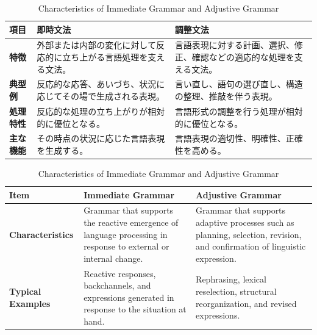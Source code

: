 \documentclass[a4paper]{article}
\begin{document}
\ifJPN
\begin{table}[ht]\centering\small
\caption{即時文法と調整文法の特徴}
\else
\begin{table}[ht]\centering\small
\caption{Characteristics of Immediate Grammar and Adjustive Grammar}
\fi
\label{tab:characteristics}

\ifJPN

\begin{tabular}{@{}
>{\raggedright\arraybackslash}p{14mm}
>{\raggedright\arraybackslash}p{68mm}
>{\raggedright\arraybackslash}p{68mm}
@{}
}

\toprule
\textbf{項目}
& \textbf{即時文法}
& \textbf{調整文法} \\
\midrule

\textbf{特徴}
& 外部または内部の変化に対して反応的に立ち上がる言語処理を支える文法。
& 言語表現に対する計画、選択、修正、確認などの適応的な処理を支える文法。 \\

\textbf{典型例}
& 反応的な応答、あいづち、状況に応じてその場で生成される表現。
& 言い直し、語句の選び直し、構造の整理、推敲を伴う表現。 \\

\textbf{処理特性}
& 反応的な処理の立ち上がりが相対的に優位となる。
& 言語形式の調整を行う処理が相対的に優位となる。 \\

\textbf{主な機能}
& その時点の状況に応じた言語表現を生成する。
& 言語表現の適切性、明確性、正確性を高める。 \\

\end{tabular}
\end{table}

\else

\begin{tabular}{@{}
>{\raggedright\arraybackslash}p{30mm}
>{\raggedright\arraybackslash}p{60mm}
>{\raggedright\arraybackslash}p{60mm}
@{}
}

\toprule
\textbf{Item}
& \textbf{Immediate Grammar}
& \textbf{Adjustive Grammar} \\
\midrule

\textbf{Characteristics}
& Grammar that supports the reactive emergence of language processing in response to external or internal change.
& Grammar that supports adaptive processes such as planning, selection, revision, and confirmation of linguistic expression. \\

\textbf{Typical Examples}
& Reactive responses, backchannels, and expressions generated in response to the situation at hand.
& Rephrasing, lexical reselection, structural reorganization, and revised expressions. \\


\end{tabular}
\end{table}
\end{document}
